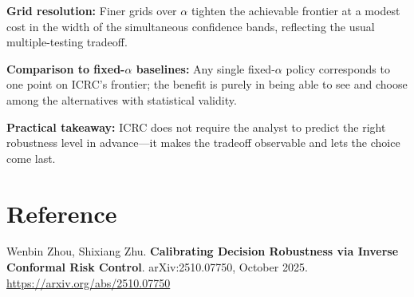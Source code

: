 \documentclass[10pt,twocolumn]{article}
\begin{document}
\textbf{Grid resolution:} Finer grids over $\alpha$ tighten the
achievable frontier at a modest cost in the width of the simultaneous
confidence bands, reflecting the usual multiple-testing tradeoff.

\textbf{Comparison to fixed-$\alpha$ baselines:} Any single fixed-$\alpha$
policy corresponds to one point on ICRC's frontier; the benefit is
purely in being able to see and choose among the alternatives with
statistical validity.

\textbf{Practical takeaway:} ICRC does not require the analyst to
predict the right robustness level in advance---it makes the tradeoff
observable and lets the choice come last.

\section*{Reference}

Wenbin Zhou, Shixiang Zhu.
\textbf{Calibrating Decision Robustness via Inverse Conformal Risk
Control}.
arXiv:2510.07750, October 2025.
\url{https://arxiv.org/abs/2510.07750}
\end{document}
